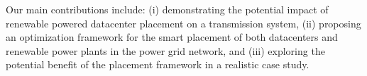  Our main contributions include: (i) demonstrating the potential impact of renewable powered datacenter placement on a transmission system, (ii) proposing an optimization framework for the smart placement of both datacenters and renewable power plants in the power grid network, and (iii) exploring the potential benefit of the placement framework in a realistic case study.





